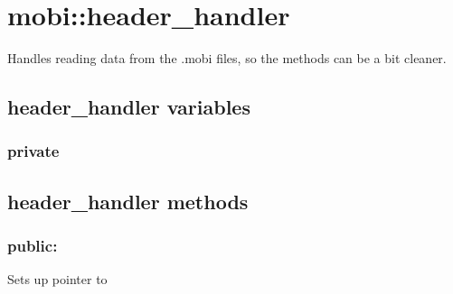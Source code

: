 \documentclass[letterpaper,10pt,english]{sphinxmanual}
\begin{document}
\section{mobi::header\_handler}
\label{header_handler:mobi-header-handler}\label{header_handler::doc}

\begin{fulllineitems}
\label{header_handler:header_handler}
Handles reading data from the .mobi files, so the {\hyperref[mobireader:mobi::mobireader]{}}
methods can be a bit cleaner.

\end{fulllineitems}



\subsection{header\_handler variables}
\label{header_handler:header-handler-variables}

\subsubsection{private}
\label{header_handler:private}

\subsection{header\_handler methods}
\label{header_handler:header-handler-methods}\begin{quote}

\begin{fulllineitems}
\label{header_handler:header_handler::file__std::ifstreamP}
\end{fulllineitems}

\end{quote}


\subsubsection{public:}
\label{header_handler:public}

\begin{fulllineitems}
\label{header_handler:header_handler__std::ifstreamP}
Sets up {\hyperref[header_handler:header_handler::file__std::ifstreamP]{}} pointer to
{\hyperref[mobireader:mobireader::file__ifstreamP]{}}

\end{fulllineitems}
\end{document}
